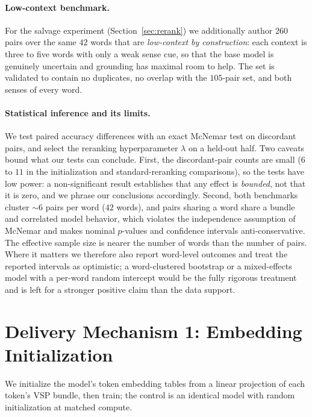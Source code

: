 \documentclass[twoside,11pt]{article}
\begin{document}
\paragraph{Low-context benchmark.}
For the salvage experiment (Section~\ref{sec:rerank}) we additionally author $260$ pairs over the same $42$ words that are \emph{low-context by construction}: each context is three to five words with only a weak sense cue, so that the base model is genuinely uncertain and grounding has maximal room to help. The set is validated to contain no duplicates, no overlap with the $105$-pair set, and both senses of every word.

\paragraph{Statistical inference and its limits.}
We test paired accuracy differences with an exact McNemar test on discordant pairs, and select the reranking hyperparameter $\lambda$ on a held-out half. Two caveats bound what our tests can conclude. First, the discordant-pair counts are small ($6$ to $11$ in the initialization and standard-reranking comparisons), so the tests have low power: a non-significant result establishes that any effect is \emph{bounded}, not that it is zero, and we phrase our conclusions accordingly. Second, both benchmarks cluster $\sim$$6$ pairs per word ($42$ words), and pairs sharing a word share a bundle and correlated model behavior, which violates the independence assumption of McNemar and makes nominal $p$-values and confidence intervals anti-conservative. The effective sample size is nearer the number of words than the number of pairs. Where it matters we therefore also report word-level outcomes and treat the reported intervals as optimistic; a word-clustered bootstrap or a mixed-effects model with a per-word random intercept would be the fully rigorous treatment and is left for a stronger positive claim than the data support.

\section{Delivery Mechanism 1: Embedding Initialization}
\label{sec:init}

We initialize the model's token embedding tables from a linear projection of each token's VSP bundle, then train; the control is an identical model with random initialization at matched compute.
\end{document}
